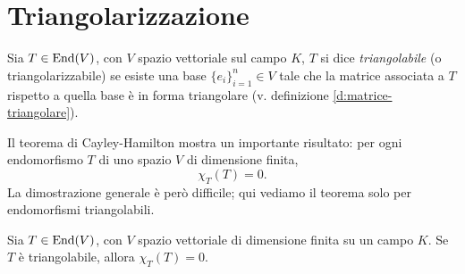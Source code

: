\section{Triangolarizzazione}
\begin{definizione} \label{d:endomorfismo-triangolabile}
	Sia $T\in \operatorname{End}(V)$, con $V$ spazio vettoriale sul campo $K$, $T$ si dice \emph{triangolabile} (o triangolarizzabile) se esiste una base $\{e_i\}_{i=1}^n\in V$ tale che la matrice associata a $T$ rispetto a quella base è in forma triangolare (v. definizione \ref{d:matrice-triangolare}).
\end{definizione}
Il teorema di Cayley-Hamilton mostra un importante risultato: per ogni endomorfismo $T$ di uno spazio $V$ di dimensione finita,
\begin{equation*}
	\chi_T(T)=0.
\end{equation*}
La dimostrazione generale è però difficile; qui vediamo il teorema solo per endomorfismi triangolabili.
\begin{teorema} \label{t:cayley-hamilton}
	Sia $T\in \operatorname{End}(V)$, con $V$ spazio vettoriale di dimensione finita su un campo $K$.
	Se $T$ è triangolabile, allora $\chi_T(T) = 0$.
\end{teorema}
